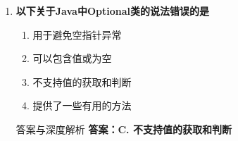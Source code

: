 \documentclass[12pt, a4paper]{ctexart}
\begin{document}
\begin{enumerate}[label=\textbf{\arabic*.}]
\begin{bluebox}{答案与深度解析}
\begin{itemize}[label={}, leftmargin=*, nosep]
\begin{itemize}[label={}, nosep]
			      \item 需要通过具体类调用
		      

					  \end{itemize}
		      \item \textbf{C. DateFormat.format — 错误}
					  \begin{itemize}[label={}, nosep]
		      
			      \item DateFormat是抽象类，不能直接使用
		      

					  \end{itemize}
		      \item \textbf{D. SimpleDateFormat.format() — 正确}
					  \begin{itemize}[label={}, nosep]
		      
			      \item SimpleDateFormat是DateFormat的实现类
			      \item 格式：new SimpleDateFormat("yyyy-MM-dd").format(date)
		      

		      
					  \end{itemize}
					  \end{itemize}
\textbf{【应背诵知识点】}

		      日期格式化：
		      \begin{itemize}[label={}, nosep]
			      \item SimpleDateFormat：线程不安全
			      \item JDK8+：DateTimeFormatter（线程安全）
			      \item 常用格式：yyyy年MM月dd日 HH:mm:ss
		      \end{itemize}
	      \end{bluebox}

	      \vspace{1em}

	\item \textbf{以下关于Java中Optional类的说法错误的是}
	      \begin{enumerate}[label=\Alph*.]
		      \item 用于避免空指针异常
		      \item 可以包含值或为空
		      \item 不支持值的获取和判断
		      \item 提供了一些有用的方法
	      \end{enumerate}

	      \begin{bluebox}{答案与深度解析}
		      \textbf{答案：C. 不支持值的获取和判断}


\end{bluebox}
\end{enumerate}
\end{document}
